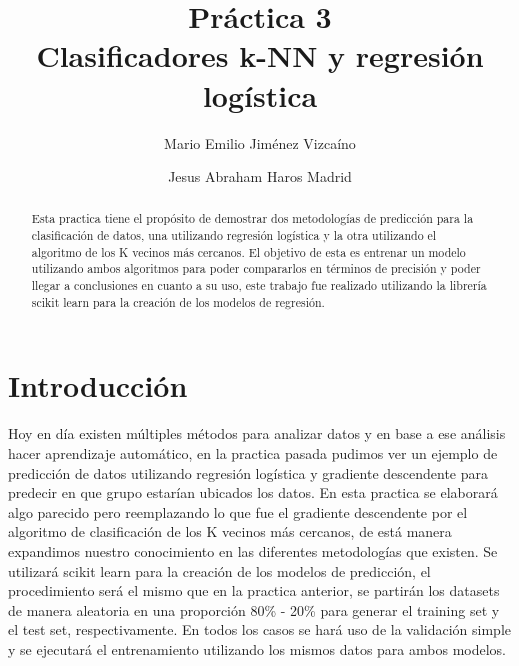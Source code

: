\documentclass[sigconf,authorversion,nonacm]{acmart}
\begin{document}
\title{Práctica 3 \\ Clasificadores k-NN y regresión logística}

\author{Mario Emilio Jiménez Vizcaíno}

\author{Jesus Abraham Haros Madrid}


\begin{abstract}
Esta practica tiene el propósito de demostrar dos metodologías de predicción para la clasificación de datos, una utilizando regresión logística y la otra utilizando el algoritmo de los K vecinos más cercanos. El objetivo de esta es entrenar un modelo utilizando ambos algoritmos para poder compararlos en términos de precisión y poder llegar a conclusiones en cuanto a su uso, este trabajo fue realizado utilizando la librería scikit learn para la creación de los modelos de regresión.
\end{abstract}

\maketitle

\section{Introducción}
Hoy en día existen múltiples métodos para analizar datos y en base a ese análisis hacer aprendizaje automático, en la practica pasada pudimos ver un ejemplo de predicción de datos utilizando regresión logística y gradiente descendente para predecir en que grupo estarían ubicados los datos. En esta practica se elaborará algo parecido pero reemplazando lo que fue el gradiente descendente por el algoritmo de clasificación de los K vecinos más cercanos, de está manera expandimos nuestro conocimiento en las diferentes metodologías que existen.
Se utilizará scikit learn para la creación de los modelos de predicción, el procedimiento será el mismo que en la practica anterior, se partirán los datasets de manera aleatoria en una proporción 80\% - 20\% para generar el training set y el test set, respectivamente. En todos los casos se hará uso de la validación simple y se ejecutará el entrenamiento utilizando los mismos datos para ambos modelos.
\end{document}
